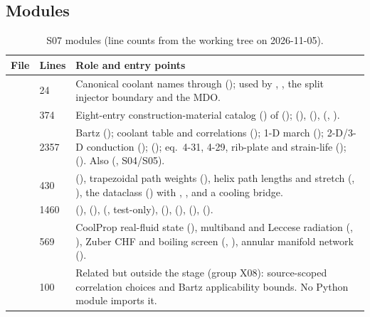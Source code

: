 \subsection{Modules}\label{sec:s07-modules}

\begin{table}[!htb]
\centering\footnotesize
\caption{S07 modules (line counts from the working tree on 2026-11-05).}\label{tab:s07-modules}
\begin{tabularx}{\linewidth}{P{3.7cm}P{0.9cm}Y}
\toprule
File & Lines & Role and entry points\\
\midrule
{} & 24 & Canonical coolant names through  (); used by , , the split injector boundary and the MDO.\\
 & 374 & Eight-entry construction-material catalog  () of  ();  (),  (),  (, ).\\
 & 2357 & Bartz (); coolant table and correlations (); 1-D march  (); 2-D/3-D conduction ();  (); eq.\ 4-31, 4-29, rib-plate and strain-life ();  (). Also  (, S04/S05).\\
 & 430 &  (), trapezoidal path weights (), helix path lengths and stretch (, ), the  dataclass () with , ,  and a cooling bridge.\\
 & 1460 &  (),  (),  (, test-only),  (),  (),  (),  ().\\
 & 569 & CoolProp real-fluid state (), multiband and Leccese radiation (, ), Zuber CHF and boiling screen (, ), annular manifold network ().\\
\midrule
{} & 100 & Related but outside the stage (group X08): source-scoped correlation choices and Bartz applicability bounds. No Python module imports it.\\
\bottomrule
\end{tabularx}
\end{table}

